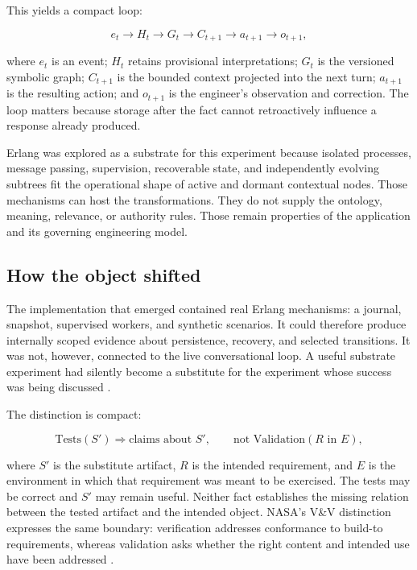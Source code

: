 \documentclass[10pt,a4paper]{article}
\begin{document}
This yields a compact loop:

\begin{equation}
e_t \longrightarrow H_t \longrightarrow G_t \longrightarrow C_{t+1}
\longrightarrow a_{t+1} \longrightarrow o_{t+1},
\end{equation}

where $e_t$ is an event; $H_t$ retains provisional interpretations; $G_t$ is the versioned symbolic graph; $C_{t+1}$ is the bounded context projected into the next turn; $a_{t+1}$ is the resulting action; and $o_{t+1}$ is the engineer's observation and correction. The loop matters because storage after the fact cannot retroactively influence a response already produced.

Erlang was explored as a substrate for this experiment because isolated processes, message passing, supervision, recoverable state, and independently evolving subtrees fit the operational shape of active and dormant contextual nodes. Those mechanisms can host the transformations. They do not supply the ontology, meaning, relevance, or authority rules. Those remain properties of the application and its governing engineering model.

\subsection{How the object shifted}

The implementation that emerged contained real Erlang mechanisms: a journal, snapshot, supervised workers, and synthetic scenarios. It could therefore produce internally scoped evidence about persistence, recovery, and selected transitions. It was not, however, connected to the live conversational loop. A useful substrate experiment had silently become a substitute for the experiment whose success was being discussed \cite{sessionrecord,daybreakblind,daybreakguided}.

The distinction is compact:

\begin{equation}
\text{Tests}(S') \Rightarrow \text{claims about } S',
\qquad
\text{not } \text{Validation}(R \text{ in } E),
\end{equation}

where $S'$ is the substitute artifact, $R$ is the intended requirement, and $E$ is the environment in which that requirement was meant to be exercised. The tests may be correct and $S'$ may remain useful. Neither fact establishes the missing relation between the tested artifact and the intended object. NASA's V\&V distinction expresses the same boundary: verification addresses conformance to build-to requirements, whereas validation asks whether the right content and intended use have been addressed \cite{nasaivv}.
\end{document}
